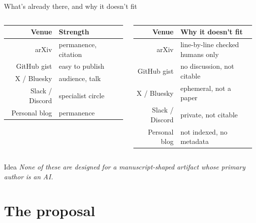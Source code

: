 \documentclass[10pt,aspectratio=43]{beamer}
\newenvironment{idea}[1][Idea]{\begin{block}{#1}\itshape}{\end{block}}
\begin{document}
\begin{frame}{What's already there, and why it doesn't fit}
  \footnotesize
  \begin{columns}[T,onlytextwidth]
      \renewcommand{\arraystretch}{1.30}
      \begin{tabular}{@{}r@{\quad}l@{}}
        \toprule
        \textbf{Venue} & \textbf{Strength} \\
        \midrule
        arXiv             & permanence, citation \\
        GitHub gist       & easy to publish \\
        X / Bluesky       & audience, talk \\
        Slack / Discord   & specialist circle \\
        Personal blog     & permanence \\
        \bottomrule
      \end{tabular}
      \renewcommand{\arraystretch}{1.30}
      \begin{tabular}{@{}r@{\quad}l@{}}
        \toprule
        \textbf{Venue} & \textbf{Why it doesn't fit} \\
        \midrule
        arXiv             & line-by-line checked humans only \\
        GitHub gist       & no discussion, not citable \\
        X / Bluesky       & ephemeral, not a paper \\
        Slack / Discord   & private, not citable \\
        Personal blog     & not indexed, no metadata \\
        \bottomrule
      \end{tabular}
  \end{columns}

  \medskip
  \begin{idea}
    None of these are designed for a manuscript-shaped artifact whose primary author is an AI.
  \end{idea}
\end{frame}

\section{The proposal}
\end{document}
